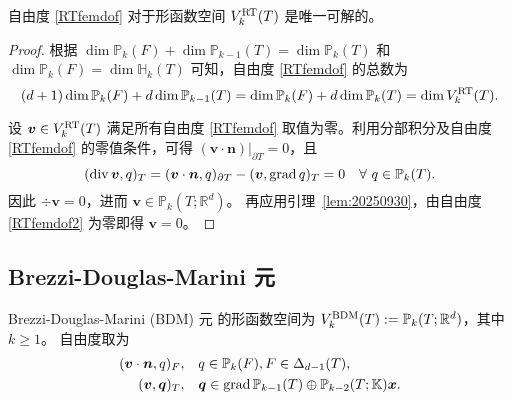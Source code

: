 \begin{lemma}\label{lem:unisovlenRTfem}
自由度 \eqref{RTfemdof} 对于形函数空间 $V_k^{\rm RT}(T)$ 是唯一可解的。
\end{lemma}
\begin{proof}
根据 $\dim\mathbb P_{k}(F)+\dim\mathbb P_{k-1}(T)=\dim\mathbb P_{k}(T)$ 和 $\dim\mathbb P_{k}(F)=\dim \mathbb H_{k}(T)$ 可知，自由度 \eqref{RTfemdof} 的总数为
\begin{equation*}
(d+1)\dim\mathbb P_{k}(F)+d\dim\mathbb P_{k-1}(T) = \dim\mathbb P_{k}(F)+d\dim\mathbb P_{k}(T) = \dim V_k^{\rm RT}(T).
\end{equation*}

设 $\boldsymbol{v}\in V_k^{\rm RT}(T)$ 满足所有自由度 \eqref{RTfemdof} 取值为零。利用分部积分及自由度 \eqref{RTfemdof} 的零值条件，可得 $(\boldsymbol{v}\cdot\boldsymbol{n})|_{\partial T}=0$，且 
\begin{equation*}
(\operatorname{div}\boldsymbol{v}, q)_T=(\boldsymbol{v}\cdot\boldsymbol{n},q)_{\partial T} - (\boldsymbol{v},\operatorname{grad} q)_T=0\quad\forall~q\in \mathbb P_{k}(T).
\end{equation*}
因此 $\div\boldsymbol{v}=0$，进而 $\boldsymbol{v}\in \mathbb P_{k}(T; \mathbb R^d)$。
再应用引理~\ref{lem:20250930}，由自由度 \eqref{RTfemdof2} 为零即得 $\boldsymbol{v}=0$。
\end{proof}


\subsection{Brezzi-Douglas-Marini 元}

Brezzi-Douglas-Marini (BDM) 元 \cite{BrezziDouglasMarini1985,BrezziDouglasDuranFortin1987,Nedelec1986,ChenHuang2022,ChenChenHuangWei2024,ChenHuang2024} 的形函数空间为 $V_k^{\rm BDM}(T):= \mathbb P_{k}(T; \mathbb R^d)$，其中 $k\geq1$。
自由度取为
\begin{subequations}\label{BDMfemdof}
\begin{align}
(\boldsymbol v\cdot\boldsymbol  n, q)_F, & \quad q\in\mathbb P_{k}(F),  F\in\Delta_{d-1}(T),\label{BDMfemdof1}\\
(\boldsymbol v, \boldsymbol q)_T, & \quad \boldsymbol q\in\operatorname{grad} \mathbb P_{k-1}(T)\oplus\mathbb P_{k-2}(T;\mathbb K)\boldsymbol x. \label{BDMfemdof2}
\end{align}
\end{subequations}



